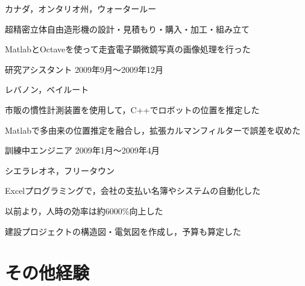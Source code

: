 \documentclass[10pt, a4paper]{article}
\begin{document}
\begin{outerlist}
\vspace{-2\baselineskip}
\hfill カナダ，オンタリオ州，ウォータールー
  \begin{innerlist}
  \item 超精密立体自由造形機の設計・見積もり・購入・加工・組み立て
  \item MatlabとOctaveを使って走査電子顕微鏡写真の画像処理を行った
  \end{innerlist}

\item[\href{http://www.aub.edu.lb/fea/me/research_labs/cvl/Pages/home.aspx}{\parbox[t]{3cm}{\raggedleft ベイルート・\\アメリカン大学\\移動ロボット研究室}}]{研究アシスタント} \hfill {2009年9月〜2009年12月}

\vspace{-2\baselineskip}
\hfill レバノン，ベイルート
  \begin{innerlist}
  \item 市販の慣性計測装置を使用して，C++でロボットの位置を推定した
  \item Matlabで多由来の位置推定を融合し，拡張カルマンフィルターで誤差を収めた
  \end{innerlist}

\item[{\parbox[t]{3cm}{\raggedleft Sierra Construction Systems有限会社}}]{訓練中エンジニア} \hfill {2009年1月〜2009年4月}

\vspace{-\baselineskip}
\hfill シエラレオネ，フリータウン
  \begin{innerlist}
  \item Excelプログラミングで，会社の支払い名簿やシステムの自動化した
  \item 以前より，人時の効率は約6000\%向上した
  \item 建設プロジェクトの構造図・電気図を作成し，予算も算定した
  \end{innerlist}

\end{outerlist}

\section{その他経験}
\end{document}
